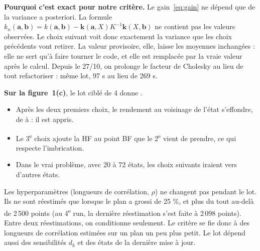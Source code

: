 \documentclass[11pt,a4paper]{article}
\begin{document}
\textbf{Pourquoi c'est exact pour notre critère.} Le gain~\eqref{eq:gain} ne dépend que de la variance
a posteriori. La formule $k_n(\bm a,\bm b)=k(\bm a,\bm b)-\bm k(\bm a,X)K^{-1}\bm k(X,\bm b)$ ne contient pas
les valeurs observées. Le choix suivant voit donc exactement la variance que les choix précédents vont
retirer. La valeur provisoire, elle, laisse les moyennes inchangées : elle ne sert qu'à faire tourner le code,
et elle est remplacée par la vraie valeur après le calcul. Depuis le 27/10, on prolonge le facteur de
Cholesky au lieu de tout refactoriser : même lot, 97 s au lieu de 269 s.

\textbf{Sur la figure~1(c)}, le lot ciblé de 4 donne \valLot.
\begin{itemize}
  \item Après les deux premiers choix, le rendement au voisinage de l'état s'effondre, de
        \valRendementAvantA{} à \valRendementAvantC{} : il est appris.
  \item Le 3\textsuperscript{e} choix ajoute la HF au point BF que le 2\textsuperscript{e} vient de prendre,
        ce qui respecte l'imbrication.
  \item Dans le vrai problème, avec 20 à 72 états, les choix suivants iraient vers d'autres états.
\end{itemize}

\begin{subtilite}
Les hyperparamètres (longueurs de corrélation, $\rho$) ne changent pas pendant le lot. Ils ne sont
réestimés que lorsque le plan a grossi de 25 \%, et plus du tout au-delà de 2\,500 points (au
4\textsuperscript{e} run, la dernière réestimation s'est faite à 2\,098 points). Entre deux réestimations, on
conditionne seulement. Le
critère se fie donc à des longueurs de corrélation estimées sur un plan un peu plus petit. Le lot dépend
aussi des sensibilités $d_k$ et des états de la dernière mise à jour.
\end{subtilite}

\end{document}
